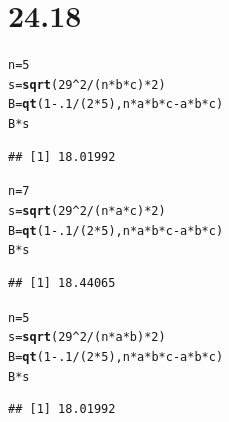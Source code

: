 \documentclass{article}\usepackage[]{graphicx}\usepackage[]{color}
\makeatletter
\newcommand{\hlnum}[1]{\textcolor[rgb]{0.686,0.059,0.569}{#1}}%
\newcommand{\hlopt}[1]{\textcolor[rgb]{0,0,0}{#1}}%
\newcommand{\hlstd}[1]{\textcolor[rgb]{0.345,0.345,0.345}{#1}}%
\newcommand{\hlkwb}[1]{\textcolor[rgb]{0.69,0.353,0.396}{#1}}%
\newcommand{\hlkwd}[1]{\textcolor[rgb]{0.737,0.353,0.396}{\textbf{#1}}}%
\newenvironment{kframe}{%
 \def\at@end@of@kframe{}%
 \ifinner\ifhmode%
  \def\at@end@of@kframe{\end{minipage}}%
  \begin{minipage}{\columnwidth}%
 \fi\fi%
 \def\FrameCommand##1{\hskip\@totalleftmargin \hskip-\fboxsep
 \colorbox{shadecolor}{##1}\hskip-\fboxsep
     \hskip-\linewidth \hskip-\@totalleftmargin \hskip\columnwidth}%
 \MakeFramed {\advance\hsize-\width
   \@totalleftmargin\z@ \linewidth\hsize
   \@setminipage}}%
 {\par\unskip\endMakeFramed%
 \at@end@of@kframe}
\newenvironment{knitrout}{}{} %
\makeatother
\begin{document}
\section{24.18}

\begin{knitrout}
\color{fgcolor}\begin{kframe}
\begin{alltt}
  \hlstd{n} \hlkwb{=} \hlnum{5}
  \hlstd{s} \hlkwb{=} \hlkwd{sqrt}\hlstd{(}\hlnum{29}\hlopt{^}\hlnum{2}\hlopt{/}\hlstd{(n}\hlopt{*}\hlstd{b}\hlopt{*}\hlstd{c)}\hlopt{*}\hlnum{2}\hlstd{)}
  \hlstd{B} \hlkwb{=} \hlkwd{qt}\hlstd{(}\hlnum{1} \hlopt{-} \hlnum{.1}\hlopt{/}\hlstd{(}\hlnum{2}\hlopt{*}\hlnum{5}\hlstd{), n}\hlopt{*}\hlstd{a}\hlopt{*}\hlstd{b}\hlopt{*}\hlstd{c} \hlopt{-} \hlstd{a}\hlopt{*}\hlstd{b}\hlopt{*}\hlstd{c)}
  \hlstd{B}\hlopt{*}\hlstd{s}
\end{alltt}
\begin{verbatim}
## [1] 18.01992
\end{verbatim}
\begin{alltt}
  \hlstd{n} \hlkwb{=} \hlnum{7}
  \hlstd{s} \hlkwb{=} \hlkwd{sqrt}\hlstd{(}\hlnum{29}\hlopt{^}\hlnum{2}\hlopt{/}\hlstd{(n}\hlopt{*}\hlstd{a}\hlopt{*}\hlstd{c)}\hlopt{*}\hlnum{2}\hlstd{)}
  \hlstd{B} \hlkwb{=} \hlkwd{qt}\hlstd{(}\hlnum{1} \hlopt{-} \hlnum{.1}\hlopt{/}\hlstd{(}\hlnum{2}\hlopt{*}\hlnum{5}\hlstd{), n}\hlopt{*}\hlstd{a}\hlopt{*}\hlstd{b}\hlopt{*}\hlstd{c} \hlopt{-} \hlstd{a}\hlopt{*}\hlstd{b}\hlopt{*}\hlstd{c)}
  \hlstd{B}\hlopt{*}\hlstd{s}
\end{alltt}
\begin{verbatim}
## [1] 18.44065
\end{verbatim}
\begin{alltt}
  \hlstd{n} \hlkwb{=} \hlnum{5}
  \hlstd{s} \hlkwb{=} \hlkwd{sqrt}\hlstd{(}\hlnum{29}\hlopt{^}\hlnum{2}\hlopt{/}\hlstd{(n}\hlopt{*}\hlstd{a}\hlopt{*}\hlstd{b)}\hlopt{*}\hlnum{2}\hlstd{)}
  \hlstd{B} \hlkwb{=} \hlkwd{qt}\hlstd{(}\hlnum{1} \hlopt{-} \hlnum{.1}\hlopt{/}\hlstd{(}\hlnum{2}\hlopt{*}\hlnum{5}\hlstd{), n}\hlopt{*}\hlstd{a}\hlopt{*}\hlstd{b}\hlopt{*}\hlstd{c} \hlopt{-} \hlstd{a}\hlopt{*}\hlstd{b}\hlopt{*}\hlstd{c)}
  \hlstd{B}\hlopt{*}\hlstd{s}
\end{alltt}
\begin{verbatim}
## [1] 18.01992
\end{verbatim}
\end{kframe}
\end{knitrout}
\end{document}
